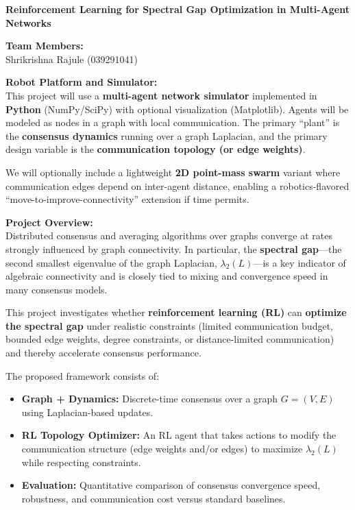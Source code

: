 \documentclass[11pt, letterpaper]{article}
\begin{document}
\begin{center}
{\LARGE \textbf{Reinforcement Learning for Spectral Gap Optimization in Multi-Agent Networks}} \\[6pt]
\end{center}

\vspace{0.3cm}

\textbf{Team Members:} \\
Shrikrishna Rajule (039291041) \\

\vspace{0.4cm}

\textbf{Robot Platform and Simulator:} \\

This project will use a \textbf{multi-agent network simulator} implemented in \textbf{Python} (NumPy/SciPy) with optional visualization (Matplotlib). Agents will be modeled as nodes in a graph with local communication. The primary ``plant'' is the \textbf{consensus dynamics} running over a graph Laplacian, and the primary design variable is the \textbf{communication topology (or edge weights)}. 

We will optionally include a lightweight \textbf{2D point-mass swarm} variant where communication edges depend on inter-agent distance, enabling a robotics-flavored ``move-to-improve-connectivity'' extension if time permits.

\vspace{0.4cm}

\textbf{Project Overview:} \\

Distributed consensus and averaging algorithms over graphs converge at rates strongly influenced by graph connectivity. In particular, the \textbf{spectral gap}---the second smallest eigenvalue of the graph Laplacian, $\lambda_2(L)$---is a key indicator of algebraic connectivity and is closely tied to mixing and convergence speed in many consensus models.

This project investigates whether \textbf{reinforcement learning (RL)} can \textbf{optimize the spectral gap} under realistic constraints (limited communication budget, bounded edge weights, degree constraints, or distance-limited communication) and thereby accelerate consensus performance.

The proposed framework consists of:

\begin{itemize}[leftmargin=1.2em]
    \item \textbf{Graph + Dynamics:} Discrete-time consensus over a graph $G=(V,E)$ using Laplacian-based updates.
    \item \textbf{RL Topology Optimizer:} An RL agent that takes actions to modify the communication structure (edge weights and/or edges) to maximize $\lambda_2(L)$ while respecting constraints.
    \item \textbf{Evaluation:} Quantitative comparison of consensus convergence speed, robustness, and communication cost versus standard baselines.
\end{itemize}
\end{document}
